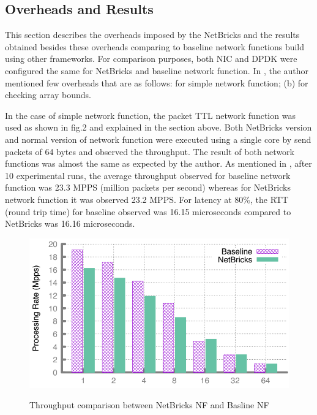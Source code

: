 \documentclass[10pt, a4paper, conference]{IEEEtran}
\begin{document}
\subsection{Overheads and Results}
This section describes the overheads imposed by the NetBricks and the results obtained besides these overheads comparing to baseline network functions build using other frameworks. For comparison purposes, both NIC and DPDK were configured the same for NetBricks and baseline network function. In \cite{Panda2016}, the author mentioned few overheads that are as follows: for simple network function; (b) for checking array bounds.

In the case of simple network function, the packet TTL network function was used as shown in fig.2 and explained in the section above. Both NetBricks version and normal version of network function were executed using a single core by send packets of 64 bytes and observed the throughput. The result of both network functions was almost the same as expected by the author. As mentioned in \cite{Panda2016}, after 10 experimental runs, the average throughput observed for baseline network function was 23.3 MPPS (million packets per second) whereas for NetBricks network function it was observed 23.2 MPPS.  For latency at 80\%, the RTT (round trip time) for baseline observed was 16.15 microseconds compared to NetBricks was 16.16 microseconds.

\begin{figure}
	\centering
	\includegraphics[width=\linewidth]{figures/fig5}
	\caption{Throughput comparison between NetBricks NF and Basline NF}
	\cite{Panda2016}
	\label{key5}
\end{figure}
\end{document}
